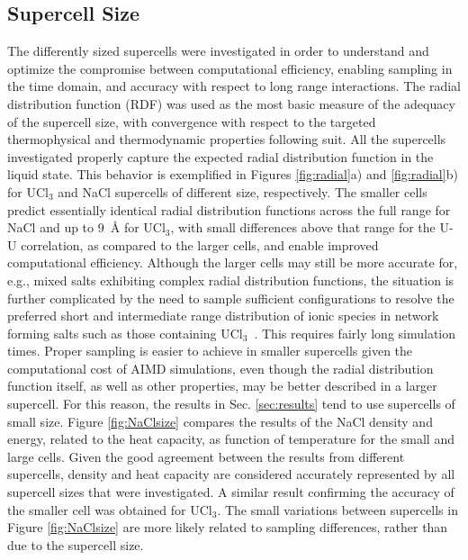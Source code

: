 \documentclass[preprint,3p,10pt,onecolumn,number,sort&compress]{elsarticle}
\begin{document}
{\color{red}\subsection{Supercell Size}
\label{sec:size}
The differently sized supercells were investigated in order to understand and optimize the compromise between computational efficiency, enabling sampling in the time domain, and accuracy with respect to long range interactions. The radial distribution function (RDF) was used as the most basic measure of the adequacy of the supercell size, with convergence with respect to the targeted thermophysical and thermodynamic properties following suit. All the supercells investigated properly capture the expected radial distribution function in the liquid state. This behavior is exemplified in Figures \ref{fig:radial}a) and \ref{fig:radial}b) for UCl$_3$ and NaCl supercells of different size, respectively. The smaller cells predict essentially identical radial distribution functions across the full range for NaCl and up to 9~\AA{} for UCl$_3$, with small differences above that range for the U-U correlation, as compared to the larger cells, and enable improved computational efficiency. Although the larger cells may still be more accurate for, e.g., mixed salts exhibiting complex radial distribution functions, the situation is further complicated by the need to sample sufficient configurations to resolve the preferred short and intermediate range distribution of ionic species in network forming salts such as those containing UCl$_3$~\cite{Li}. This requires fairly long simulation times. Proper sampling is easier to achieve in smaller supercells given the computational cost of AIMD simulations, even though the radial distribution function itself, as well as other properties, may be better described in a larger supercell. For this reason, the results in Sec. \ref{sec:results} tend to use supercells of small size. Figure \ref{fig:NaClsize} compares the results of the NaCl density and energy, related to the heat capacity, as function of temperature for the small and large cells. Given the good agreement between the results from different supercells, density and heat capacity are considered accurately represented by all supercell sizes that were investigated. A similar result confirming the accuracy of the smaller cell was obtained for UCl$_3$. 
The small variations between supercells in Figure \ref{fig:NaClsize} are more likely related to sampling differences, rather than due to the supercell size. 

}
\end{document}
